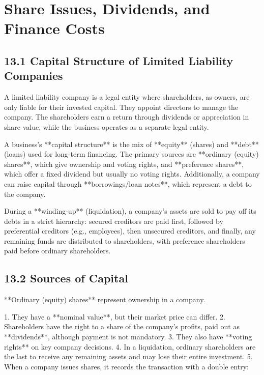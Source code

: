 \newpage 

\section*{Share Issues, Dividends, and Finance Costs}


\subsection{13.1 Capital Structure of Limited Liability Companies} 

A limited liability company is a legal entity where shareholders, as owners, are only liable for their invested capital. They appoint directors to manage the company. The shareholders earn a return through dividends or appreciation in share value, while the business operates as a separate legal entity.

A business's **capital structure** is the mix of **equity** (shares) and **debt** (loans) used for long-term financing. The primary sources are **ordinary (equity) shares**, which give ownership and voting rights, and **preference shares**, which offer a fixed dividend but usually no voting rights. Additionally, a company can raise capital through **borrowings/loan notes**, which represent a debt to the company.

During a **winding-up** (liquidation), a company's assets are sold to pay off its debts in a strict hierarchy: secured creditors are paid first, followed by preferential creditors (e.g., employees), then unsecured creditors, and finally, any remaining funds are distributed to shareholders, with preference shareholders paid before ordinary shareholders.


\subsection{ 13.2 Sources of Capital }

**Ordinary (equity) shares** represent ownership in a company.

1. They have a **nominal value**, but their market price can differ.
2. Shareholders have the right to a share of the company’s profits, paid out as **dividends**, although payment is not mandatory.
3. They also have **voting rights** on key company decisions.
4. In a liquidation, ordinary shareholders are the last to receive any remaining assets and may lose their entire investment.
5. When a company issues shares, it records the transaction with a double entry:

